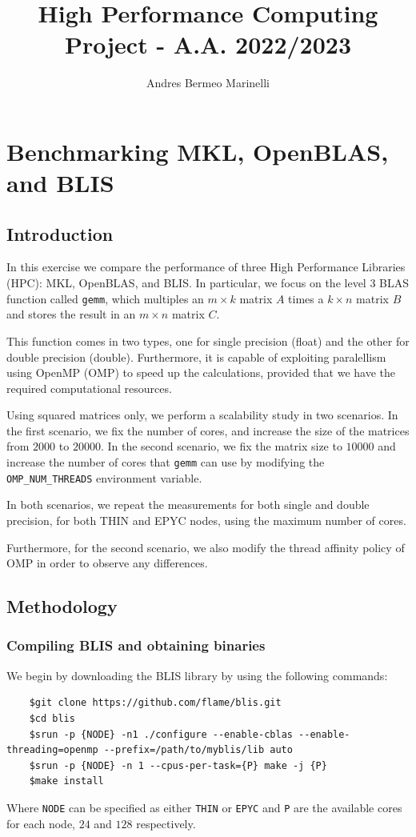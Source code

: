 \documentclass{report}
\title{High Performance Computing Project - A.A. 2022/2023}
\author{Andres Bermeo Marinelli}
\begin{document}
\maketitle
\tableofcontents
\chapter{Benchmarking MKL, OpenBLAS, and BLIS}
\section{Introduction}
In this exercise we compare the performance of three High Performance Libraries
(HPC): MKL, OpenBLAS, and BLIS. In particular, we focus on the level 3 BLAS 
function called \texttt{gemm}, which multiples an $m \times k$ matrix $A$ times 
a $k \times n$ matrix $B$ and stores the result in an $m \times n$ matrix $C$. 

This function comes in two types, one for single 
precision (float) and the other for double precision (double). Furthermore, it 
is capable of exploiting paralellism using OpenMP (OMP) to speed up the 
calculations, provided that we have the required computational resources.

Using squared matrices only, we perform a scalability study in two scenarios. 
In the first scenario, we fix the number of cores, and increase the size of the
matrices from $2000$ to $20000$. In the second scenario, we fix the matrix size 
to $10000$ and increase the number of cores that \texttt{gemm} can use by 
modifying the \texttt{OMP\_NUM\_THREADS} environment variable.

In both scenarios, we repeat the measurements for both single and double
precision, for both THIN and EPYC nodes, using the maximum number of cores.

Furthermore, for the second scenario, we also modify the thread affinity policy 
of OMP in order to observe any differences.

\section{Methodology}
\subsection{Compiling BLIS and obtaining binaries}

We begin by downloading the BLIS library by using the following commands:
\begin{verbatim}
    $git clone https://github.com/flame/blis.git
    $cd blis
    $srun -p {NODE} -n1 ./configure --enable-cblas --enable-threading=openmp --prefix=/path/to/myblis/lib auto
    $srun -p {NODE} -n 1 --cpus-per-task={P} make -j {P}
    $make install
\end{verbatim}
Where \texttt{NODE} can be specified as either \texttt{THIN} or \texttt{EPYC} and 
\texttt{P} are the available cores for each node, $24$ and $128$ respectively.
\end{document}

